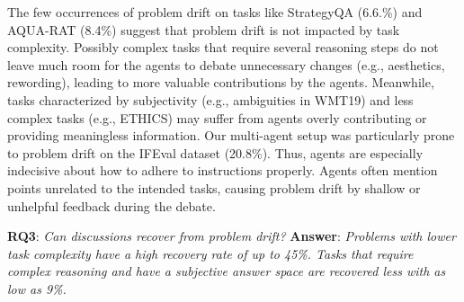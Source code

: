 The few occurrences of problem drift on tasks like StrategyQA (6.6.\%) and AQUA-RAT (8.4\%) suggest that problem drift is not impacted by task complexity.
Possibly complex tasks that require several reasoning steps do not leave much room for the agents to debate unnecessary changes (e.g., aesthetics, rewording), leading to more valuable contributions by the agents.
Meanwhile, tasks characterized by subjectivity (e.g., ambiguities in WMT19) and less complex tasks (e.g., ETHICS) may suffer from agents overly contributing or providing meaningless information.
Our multi-agent setup was particularly prone to problem drift on the IFEval dataset (20.8\%).
Thus, agents are especially indecisive about how to adhere to instructions properly.
Agents often mention points unrelated to the intended tasks, causing problem drift by shallow or unhelpful feedback during the debate.



\noindent \textbf{RQ3}: \textit{Can discussions recover from problem drift?} \textbf{Answer}: \textit{Problems with lower task complexity have a high recovery rate of up to 45\%. Tasks that require complex reasoning and have a subjective answer space are recovered less with as low as 9\%.}



